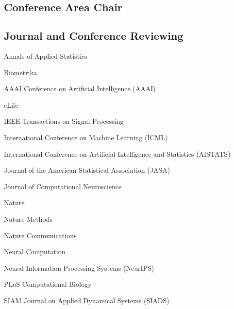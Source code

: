 \documentclass[10pt]{article}
\begin{document}
\subsection{Conference Area Chair}
\begin{singlelist}
\setlength{\cvdatewidth}{0.55in}
\item {}%
\item {}%
\item {}%
\item {}%
\end{singlelist}

\subsection{Journal and Conference Reviewing}
\begin{singlelist}
\item Annals of Applied Statistics
\item Biometrika
\item AAAI Conference on Artificial Intelligence (AAAI)
\item eLife
\item IEEE Transactions on Signal Processing
\item International Conference on Machine Learning (ICML)
\item International Conference on Artificial Intelligence and Statistics (AISTATS)
\item Journal of the American Statistical Association (JASA)
\item Journal of Computational Neuroscience
\item Nature
\item Nature Methods
\item Nature Communications
\item Neural Computation
\item Neural Information Processing Systems (NeurIPS)
\item PLoS Computational Biology
\item SIAM Journal on Applied Dynamical Systems (SIADS)
\end{singlelist}
\end{document}
